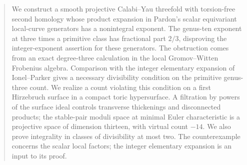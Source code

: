 \begin{abstract}
We construct a smooth projective Calabi--Yau threefold with torsion-free
second homology whose product expansion in Pardon's scalar equivariant
local-curve generators has a nonintegral exponent. The genus-ten exponent
at three times a primitive class has fractional part $2/3$, disproving
the integer-exponent assertion for these generators. The obstruction
comes from an exact degree-three calculation in the local
Gromov--Witten Frobenius algebra. Comparison with the integer elementary
expansion of Ionel--Parker gives a necessary divisibility condition on
the primitive genus-three count. We realize a count violating this
condition on a first Hirzebruch surface in a compact toric hypersurface.
A filtration by powers of the surface ideal controls transverse
thickenings and disconnected products; the stable-pair moduli space at
minimal Euler characteristic is a projective space of dimension thirteen, with virtual count
$-14$. We also prove integrality in classes of divisibility at most two.
The counterexample concerns the scalar local factors; the integer
elementary expansion is an input to its proof.
\end{abstract}
